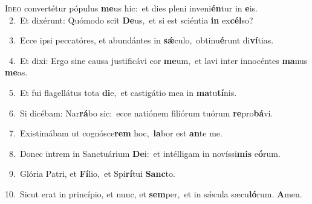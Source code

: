 \lettrine{\initial\textcolor{\initialcolor}{I}}{deo} convertétur pópulus \textbf{me}\-us hic:~\star et dies pleni inveni\-\textbf{én}\-tur in \textbf{e}\-is.\\
{\numbfont\textcolor{\numbcolor}{~2.}}~Et dixérunt: Quómodo scit \textbf{De}\-us,~\star et si est sciéntia \textbf{in} ex\-\textbf{cél}\-so?\par
{\numbfont\textcolor{\numbcolor}{~3.}}~Ecce ipsi peccatóres, et abundántes in \textbf{sǽ}\-culo,~\star obtinu\-\textbf{é}\-runt di\-\textbf{ví}\-tias.\par
{\numbfont\textcolor{\numbcolor}{~4.}}~Et dixi: Ergo sine causa justificávi cor \textbf{me}\-um,~\star et lavi inter innocéntes \textbf{ma}\-nus \textbf{me}\-as.\par
{\numbfont\textcolor{\numbcolor}{~5.}}~Et fui flagellátus tota \textbf{di}\-e,~\star et castigátio mea in \textbf{ma}\-tu\-\textbf{tí}\-nis.\par
{\numbfont\textcolor{\numbcolor}{~6.}}~Si dicébam: Nar\-\textbf{rá}\-bo sic:~\star ecce natiónem filiórum tuórum \textbf{re}\-pro\-\textbf{bá}\-vi.\par
{\numbfont\textcolor{\numbcolor}{~7.}}~Existimábam ut cognósce\textbf{rem} hoc,~\star \textbf{la}\-bor est \textbf{an}\-te me.\par
{\numbfont\textcolor{\numbcolor}{~8.}}~Donec intrem in Sanctuárium \textbf{De}\-i:~\star et intélligam in novíssi\textbf{mis} e\-\textbf{ó}\-rum.\par
{\numbfont\textcolor{\numbcolor}{~9.}}~Glória Patri, et \textbf{Fí}\-lio,~\star et Spi\-\textbf{rí}\-tui \textbf{Sanc}\-to.\par
{\numbfont\textcolor{\numbcolor}{10.}}~Sicut erat in princípio, et nunc, et \textbf{sem}\-per,~\star et in sǽcula sæcu\-\textbf{ló}\-rum. \textbf{A}\-men.\par
